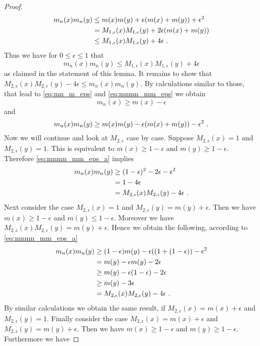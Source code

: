 \begin{lemma}
\begin{proof}
\begin{align*}
			m_n(x)m_n(y) &\leq m(x)m(y) + \epsilon(m(x) + m(y)) + \epsilon^2\\
			&= M_{1,\epsilon}(x)M_{1,\epsilon}(y) + 2\epsilon(m(x) + m(y))\\
			&\leq M_{1,\epsilon}(x)M_{1,\epsilon}(y) + 4\epsilon\textrm{ .}
		\end{align*}
		Thus we have for $0\leq \epsilon\leq 1$ that 
		$$m_n(x)m_n(y) \leq M_{1,\epsilon}(x)M_{1,\epsilon}(y) + 4\epsilon$$
		as claimed in the statement of this lemma. It remains to show that $M_{2,\epsilon}(x)M_{2,\epsilon}(y) - 4\epsilon \leq m_n(x)m_n(y)$. By calculations similar to those, that lead to \eqref{eq:mn_m_eps} and \eqref{eq:mnmn_mm_eps} we obtain
		$$m_n(x) \geq m(x) - \epsilon$$
		and
		\begin{equation}
			m_n(x)m_n(y) \geq m(x)m(y) - \epsilon(m(x) + m(y)) - \epsilon^2 \textrm{ .} \label{eq:mnmn_mm_eps_a}
		\end{equation}
		Now we will continue and look at $M_{2,\epsilon}$ case by case. Suppose $M_{2,\epsilon}(x) = 1$ and $M_{2,\epsilon}(y) = 1$. This is equivalent to $m(x) \geq 1 - \epsilon$ and $m(y) \geq 1 - \epsilon$. Therefore \eqref{eq:mnmn_mm_eps_a} implies 
		\begin{align*}
			m_n(x)m_n(y) &\geq (1-\epsilon)^2 - 2\epsilon - \epsilon^2\\
			&= 1 - 4\epsilon\\
			&= M_{2,\epsilon}(x)M_{2,\epsilon}(y) - 4\epsilon\textrm{ .}
		\end{align*}
		Next consider the case $M_{2,\epsilon}(x) = 1$ and $M_{2,\epsilon}(y) = m(y) + \epsilon$. Then we have $m(x) \geq 1-\epsilon$ and  $m(y) \leq 1-\epsilon$. Moreover we have $M_{2,\epsilon}(x)M_{2,\epsilon}(y) = m(y) + \epsilon$. Hence we obtain the following, according to \eqref{eq:mnmn_mm_eps_a}
		\begin{align*}
			m_n(x)m_n(y) &\geq (1-\epsilon)m(y) - \epsilon((1 + (1-\epsilon)) - \epsilon^2\\
			&= m(y)-\epsilon m(y) - 2\epsilon\\
			&\geq m(y)-\epsilon (1-\epsilon) - 2\epsilon\\
			&\geq m(y)-3\epsilon \\
			&= M_{2,\epsilon}(x)M_{2,\epsilon}(y) - 4\epsilon\textrm{ .}
		\end{align*} 
		By similar calculations we obtain the same result, if $M_{2,\epsilon}(x) = m(x) + \epsilon$ and $M_{2,\epsilon}(y) = 1$. Finally consider the case $M_{2,\epsilon}(x) = m(x) + \epsilon$ and $M_{2,\epsilon}(y) = m(y) + \epsilon$. Then we have $m(x) \geq 1-\epsilon$ and $m(y) \geq 1-\epsilon$. Furthermore we have 

\end{proof}
\end{lemma}

